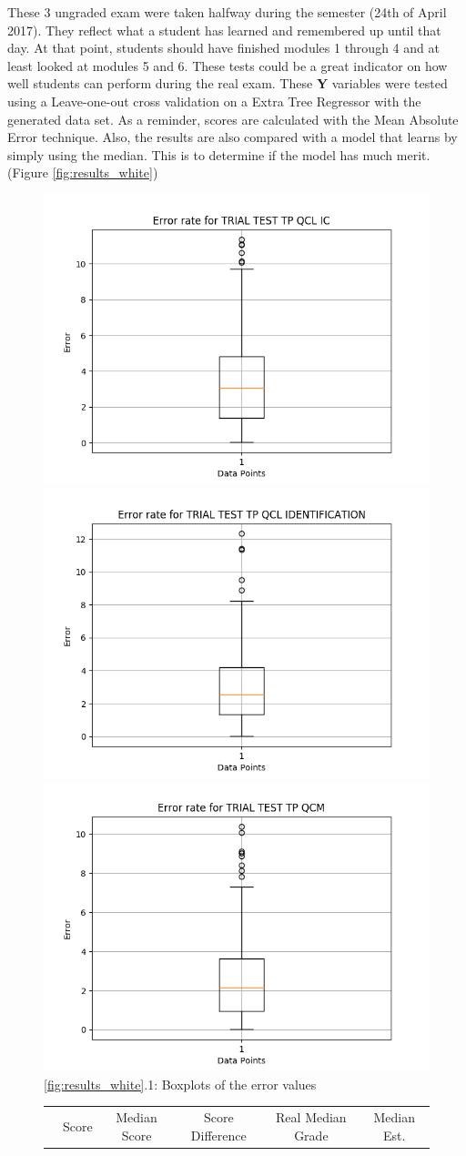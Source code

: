 \documentclass[a4paper,11pt]{report}
\numberwithin{figure}{section} %
\begin{document}
    These 3 ungraded exam were taken halfway during the semester (24th of April 2017).
    They reflect what a student has learned and remembered up until that day.
    At that point, students should have finished modules 1 through 4 and at least looked at modules 5 and 6.
    These tests could be a great indicator on how well students can perform during the real exam.
    These \textbf{Y} variables were tested using a Leave-one-out cross validation on a Extra Tree Regressor with the generated data set.
    As a reminder, scores are calculated with the Mean Absolute Error technique.
    Also, the results are also compared with a model that learns by simply using the median.
    This is to determine if the model has much merit. (Figure \ref{fig:results_white})
    \begin{figure}[H]
      \centering
  	  \includegraphics[width=.3\linewidth]{cv_boxplot_TRIAL_TEST_TP_QCL_IC_2018-04-27_14_35_12.png}
  	  \includegraphics[width=.3\linewidth]{cv_boxplot_TRIAL_TEST_TP_QCL_IDENTIFICATION_2018-04-27_14_31_56.png}
      \includegraphics[width=.3\linewidth]{cv_boxplot_TRIAL_TEST_TP_QCM_2018-04-27_17_16_59.png}
      \\
      \ref{fig:results_white}.1: Boxplots of the error values
      \\
      \vspace{0.5cm}
      \begin{tabular}{| l | c | c | c | c | c |}
      \hline
      & \tiny{Score} & \tiny{Median Score} & \tiny{Score Difference} & \tiny{Real Median Grade} & \tiny{Median Est.
}
\end{tabular}
\end{figure}
\end{document}

